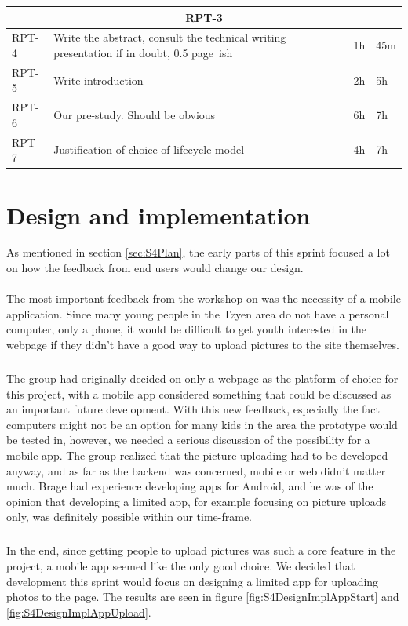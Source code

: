 \begin{minipage}{\linewidth}
\setlength{\tabcolsep}{12pt}
\centering
{}
\begin{tabular}{|p{1cm}|p{4cm}|p{2cm}|p{2cm}|}
\hline
\multicolumn{4}{|c|}{RPT-3} \\
\hline
RPT-4 & Write the abstract, consult the technical writing presentation if in doubt, 0.5 page~ish & 1h & 45m \\
RPT-5 & Write introduction & 2h & 5h \\
RPT-6 & Our pre-study. Should be obvious & 6h & 7h \\
RPT-7 & Justification of choice of lifecycle model & 4h & 7h \\
\hline
\end{tabular}
\end{minipage}

\section{Design and implementation}
\label{sec:S4DesignImpl}

As mentioned in section \ref{sec:S4Plan}, the early parts of this sprint focused a lot on how the feedback from end users would change our design.

\paragraph{} The most important feedback from the workshop on was the necessity of a mobile application. Since many young people in the T\o yen area do not have a personal computer, only a phone, it would be difficult to get youth interested in the webpage if they didn't have a good way to upload pictures to the site themselves.
\subparagraph{} The group had originally decided on only a webpage as the platform of choice for this project, with a mobile app considered something that could be discussed as an important future development. With this new feedback, especially the fact computers might not be an option for many kids in the area the prototype would be tested in, however, we needed a serious discussion of the possibility for a mobile app. The group realized that the picture uploading had to be developed anyway, and as far as the backend was concerned, mobile or web didn't matter much. Brage had experience developing apps for Android, and he was of the opinion that developing a limited app, for example focusing on picture uploads only, was definitely possible within our time-frame.
\subparagraph{} In the end, since getting people to upload pictures was such a core feature in the project, a mobile app seemed like the only good choice. We decided that development this sprint would focus on designing a limited app for uploading photos to the page. The results are seen in figure \ref{fig:S4DesignImplAppStart} and \ref{fig:S4DesignImplAppUpload}.

